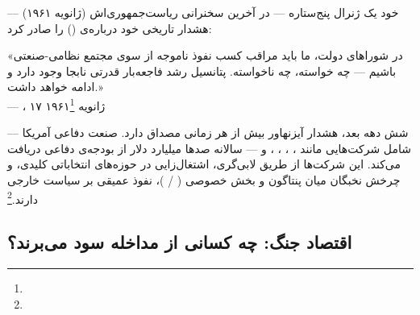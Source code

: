  — خود یک ژنرال پنج‌ستاره — در آخرین سخنرانی ریاست‌جمهوری‌اش (ژانویه ۱۹۶۱) هشدار تاریخی خود درباره‌ی  () را صادر کرد:

\begin{tcolorbox}[quotebox, title={نقل‌قول تاریخی}]
«در شوراهای دولت، ما باید مراقب کسب نفوذ ناموجه از سوی مجتمع نظامی-صنعتی باشیم — چه خواسته، چه ناخواسته. پتانسیل رشد فاجعه‌بار قدرتی نابجا وجود دارد و ادامه خواهد داشت.»\\
— ، ۱۷ ژانویه ۱۹۶۱\footnote{}
\end{tcolorbox}

شش دهه بعد، هشدار آیزنهاور بیش از هر زمانی مصداق دارد. صنعت دفاعی آمریکا — شامل شرکت‌هایی مانند ، ، ، ، و  — سالانه صدها میلیارد دلار از بودجه‌ی دفاعی دریافت می‌کند. این شرکت‌ها از طریق لابی‌گری، اشتغال‌زایی در حوزه‌های انتخاباتی کلیدی، و چرخش نخبگان میان پنتاگون و بخش خصوصی ( / )، نفوذ عمیقی بر سیاست خارجی دارند.\footnote{}

\subsection{اقتصاد جنگ: چه کسانی از مداخله سود می‌برند؟}
\label{subsec:ch12-war-profiteers}

